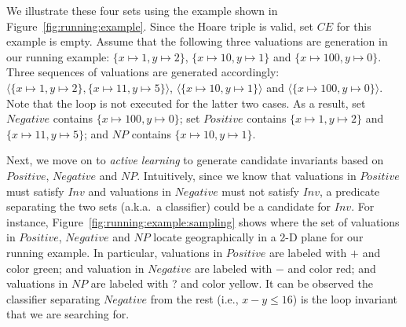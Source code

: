 %
%
\begin{example}
We illustrate these four sets using the example shown in Figure~\ref{fig:running:example}. Since the Hoare triple is valid, set $\mathit{CE}$ for this example is empty. 
Assume that the following three valuations are generation in our running example: $\{x \mapsto 1, y \mapsto 2\}$, $\{x \mapsto 10, y \mapsto 1\}$ and $\{x \mapsto 100, y \mapsto 0\}$. 
Three sequences of valuations are generated accordingly: $\langle \{x \mapsto 1, y \mapsto 2\}, \{x \mapsto 11, y \mapsto 5\} \rangle$, $\langle \{x \mapsto 10, y \mapsto 1\} \rangle$ and $\langle \{x \mapsto 100, y \mapsto 0\} \rangle$. 
Note that the loop is not executed for the latter two cases. 
As a result, set $\mathit{Negative}$ contains $\{x \mapsto 100, y \mapsto 0\}$; 
set $\mathit{Positive}$ contains $\{x \mapsto 1, y \mapsto 2\}$ and $\{x \mapsto 11, y \mapsto 5\}$; 
and $\mathit{NP}$ contains $\{x \mapsto 10, y \mapsto 1\}$.
\end{example}
Next, we move on to \emph{active learning} to generate candidate invariants based on $\mathit{Positive}$, $\mathit{Negative}$ and $\mathit{NP}$. Intuitively, since we know that valuations in $\mathit{Positive}$ must satisfy $\mathit{Inv}$ and valuations in $\mathit{Negative}$ must not satisfy $\mathit{Inv}$, a predicate separating the two sets (a.k.a.~a classifier) could be a candidate for $\mathit{Inv}$.
For instance, Figure~\ref{fig:running:example:sampling} shows where the set of valuations 
in $\mathit{Positive}$, $\mathit{Negative}$ and $\mathit{NP}$ locate geographically in a 2-D plane for our running example. %
In particular, valuations in $\mathit{Positive}$ are labeled with $+$ and color green; 
and valuation in $\mathit{Negative}$ are labeled with $-$ and color red; 
and valuations in $\mathit{NP}$ are labeled with ? and color yellow. 
It can be observed the classifier separating $\mathit{Negative}$ from the rest (i.e., $x - y \leq 16$) is the loop invariant that we are searching for. 
